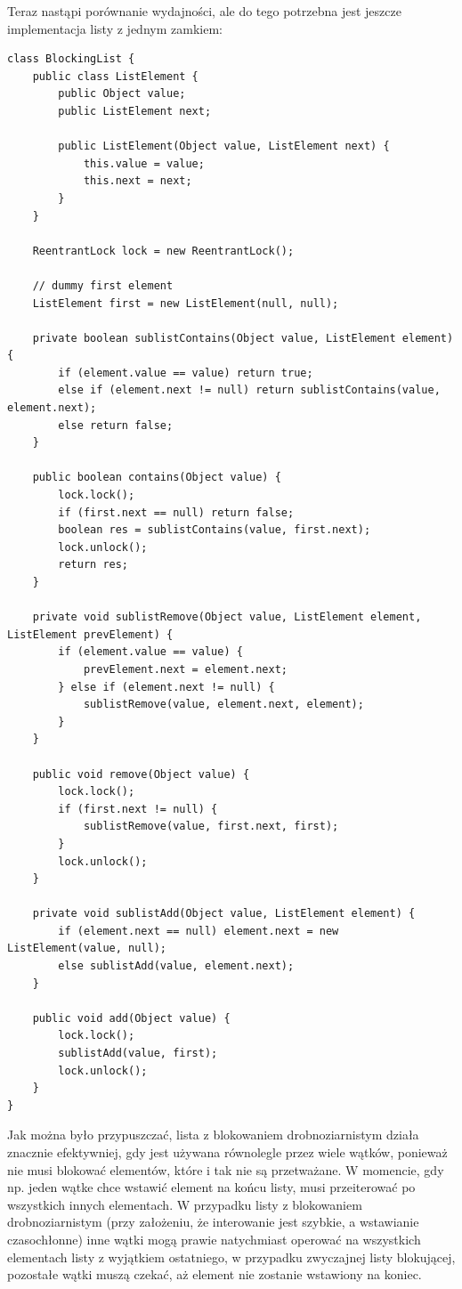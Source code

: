 \documentclass{article}
\begin{document}
Teraz nastąpi porównanie wydajności, ale do tego potrzebna jest jeszcze implementacja listy z jednym
zamkiem:

\begin{verbatim}
class BlockingList {
    public class ListElement {
        public Object value;
        public ListElement next;

        public ListElement(Object value, ListElement next) {
            this.value = value;
            this.next = next;
        }
    }

    ReentrantLock lock = new ReentrantLock();

    // dummy first element
    ListElement first = new ListElement(null, null);

    private boolean sublistContains(Object value, ListElement element) {
        if (element.value == value) return true;
        else if (element.next != null) return sublistContains(value, element.next);
        else return false;
    }

    public boolean contains(Object value) {
        lock.lock();
        if (first.next == null) return false;
        boolean res = sublistContains(value, first.next);
        lock.unlock();
        return res;
    }

    private void sublistRemove(Object value, ListElement element, ListElement prevElement) {
        if (element.value == value) {
            prevElement.next = element.next;
        } else if (element.next != null) {
            sublistRemove(value, element.next, element);
        }
    }

    public void remove(Object value) {
        lock.lock();
        if (first.next != null) {
            sublistRemove(value, first.next, first);
        }
        lock.unlock();
    }

    private void sublistAdd(Object value, ListElement element) {
        if (element.next == null) element.next = new ListElement(value, null);
        else sublistAdd(value, element.next);
    }

    public void add(Object value) {
        lock.lock();
        sublistAdd(value, first);
        lock.unlock();
    }
}
\end{verbatim}

Jak można było przypuszczać, lista z blokowaniem drobnoziarnistym działa znacznie efektywniej, gdy
jest używana równolegle przez wiele wątków, ponieważ nie musi blokować elementów, które i tak nie są
przetważane. W momencie, gdy np. jeden wątke chce wstawić element na końcu listy, musi przeiterować 
po wszystkich innych elementach. W przypadku listy z blokowaniem drobnoziarnistym (przy założeniu, że interowanie
jest szybkie, a wstawianie czasochłonne) inne wątki mogą prawie natychmiast operować na wszystkich elementach
listy z wyjątkiem ostatniego, w przypadku zwyczajnej listy blokującej, pozostałe wątki muszą czekać, aż
element nie zostanie wstawiony na koniec.
\end{document}
